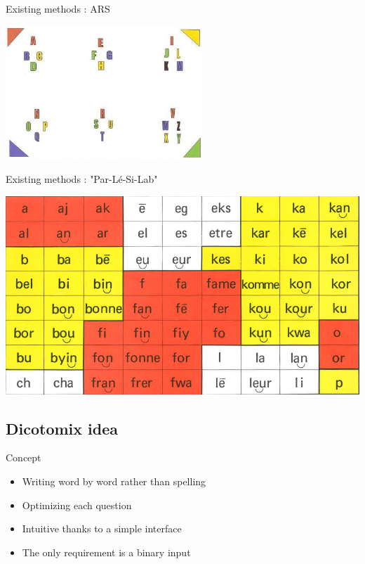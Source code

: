 \documentclass[notes]{beamer}
\begin{document}
\begin{frame}{Existing methods : ARS}
	\begin{center}
		\includegraphics[scale=0.9]{tableau_lettres_transparent}
	\end{center}
\end{frame}

\begin{frame}{Existing methods : "Par-Lé-Si-Lab"}
	\begin{center}
		\includegraphics[scale=0.3]{parler_syllabes}
	\end{center}
\end{frame}

\subsection{Dicotomix idea}
\begin{frame}{Concept}
	\begin{center}
		\begin{itemize}
			\item Writing word by word rather than spelling
			\item Optimizing each question
			\item Intuitive thanks to a simple interface
			\item The only requirement is a binary input
		\end{itemize}
	\end{center}
\end{frame}
\end{document}
